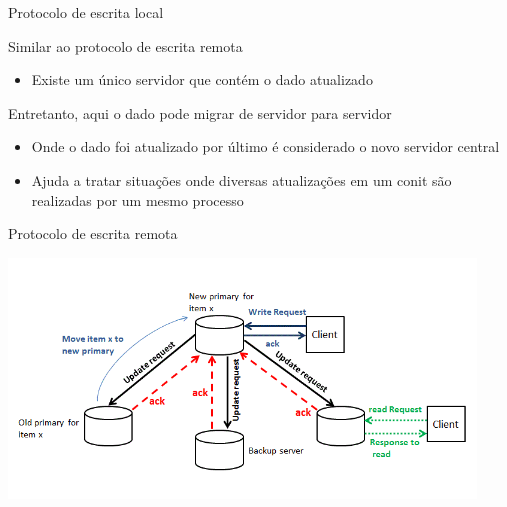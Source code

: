 \documentclass[compress]{beamer}
\begin{document}

\begin{frame}{Protocolo de escrita local}

Similar ao protocolo de escrita remota
\begin{itemize}
    \item Existe um único servidor que contém o dado atualizado
\end{itemize}

\vspace{0,5cm}

Entretanto, aqui o dado pode migrar de servidor para servidor
\begin{itemize}
    \item Onde o dado foi atualizado por último é considerado o novo servidor central
    \item Ajuda a tratar situações onde diversas atualizações em um conit são realizadas por um mesmo processo
\end{itemize}
\end{frame}


\begin{frame}{Protocolo de escrita remota}

\centering \includegraphics[width=0.93\textwidth]{images/local-write.png}
\end{frame}

\end{document}
